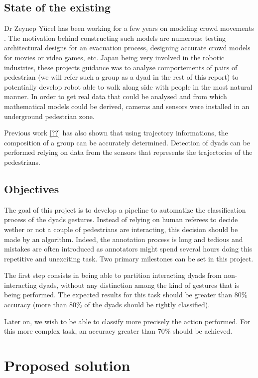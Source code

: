 \documentclass[12pt,a4paper,twoside]{article}
\begin{document}
\subsection{State of the existing}
Dr Zeynep Yücel has been working for a few years on modeling crowd movements \cite{Zanlungo2017}\cite{Yucel2013}\cite{Yucel2017}. The motivation behind constructing such models are numerous: testing architectural designs for an evacuation process, designing accurate crowd models for movies or video games, etc. Japan being very involved in the robotic industries, these projects guidance was to analyse comportements of pairs of pedestrian (we will refer such a group as a dyad in the rest of this report) to potentially develop robot able to walk along side with people in the most natural manner. In order to get real data that could be analysed and from which mathematical models could be derived, cameras and sensors were installed in an underground pedestrian zone. 

Previous work \ref{??} has also shown that using trajectory informations, the composition of a group can be accurately determined. Detection of dyads can be performed relying on data from the sensors that represents the trajectories of the pedestrians.

\subsection{Objectives}
The goal of this project is to develop a pipeline to automatize the classification process of the dyads gestures. Instead of relying on human referees to decide wether or not a couple of pedestrians are interacting, this decision should be made by an algorithm. Indeed, the annotation process is long and tedious and mistakes are often introduced as annotators might spend several hours doing this repetitive and unexciting task. Two primary milestones can be set in this project.

The first step consists in being able to partition interacting dyads from non-interacting dyads, without any distinction among the kind of gestures that is being performed. The expected results for this task should be greater than 80\% accuracy (more than 80\% of the dyads should be rightly classified).

Later on, we wish to be able to classify more precisely the action performed. For this more complex task, an accuracy greater than 70\% should be achieved. 


\section{Proposed solution}
\end{document}
